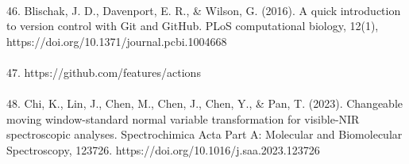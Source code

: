\documentclass[12pt,a4paper]{report}
\begin{document}
\\
46. Blischak, J. D., Davenport, E. R., & Wilson, G. (2016). A quick introduction to version control with Git and GitHub. PLoS computational biology, 12(1), https://doi.org/10.1371/journal.pcbi.1004668\\
\\
47. https://github.com/features/actions \\
\\
48. Chi, K., Lin, J., Chen, M., Chen, J., Chen, Y., & Pan, T. (2023). Changeable moving window-standard normal variable transformation for visible-NIR spectroscopic analyses. Spectrochimica Acta Part A: Molecular and Biomolecular Spectroscopy, 123726. https://doi.org/10.1016/j.saa.2023.123726 \\
\\
\end{document}
